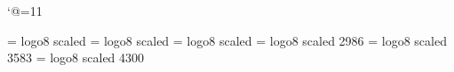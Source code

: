%
%
%
%
%


\catcode`@=11 %

\font\fourteenlogo   = logo8  scaled  %
\font\seventeenlogo   = logo8  scaled  %
\font\twentylogo   = logo8  scaled  %
\font\twentyfourlogo   = logo8  scaled 2986 %
\font\twentyninelogo   = logo8  scaled 3583 %
\font\thirtyfourlogo   = logo8  scaled 4300 %

\def\fourteenpt{\def\prm{\fam\z@\fourteenrm\def\@currfont{\rm}}%
\textfont\z@\fourteenrm \scriptfont\z@\fourteenrm 
  \scriptscriptfont\z@\fourteenrm
\textfont\@ne\fourteeni \scriptfont\@ne\fourteeni 
  \scriptscriptfont\@ne\fourteeni
\textfont\tw@\fourteensy \scriptfont\tw@\fourteensy 
  \scriptscriptfont\tw@\fourteensy
\textfont\thr@@\tenex \scriptfont\thr@@\tenex \scriptscriptfont\thr@@\tenex
\def\pit{\fam\itfam\fourteenit\def\@currfont{\it}}\textfont\itfam\fourteenit 
    \scriptfont\itfam\fourteenit \scriptscriptfont\itfam\fourteenit
\def\pbf{\fam\bffam\fourteenbf\def\@currfont{\bf}}\textfont\bffam\fourteenbf 
   \scriptfont\bffam\fourteenbf \scriptscriptfont\bffam\fourteenbf
\def\ptt{\fam\ttfam\fourteentt\def\@currfont{\tt}}\textfont\ttfam\fourteentt 
    \scriptfont\ttfam\fourteentt \scriptscriptfont\ttfam\fourteentt
\def\lasy{\fam\lyfam\fourteenlasy\def\@currfont{\lasy}}%
\textfont\lyfam\fourteenlasy \scriptfont\lyfam\fourteenlasy 
   \scriptscriptfont\lyfam\fourteenlasy
\def\@MF{\fourteenlogo}}

